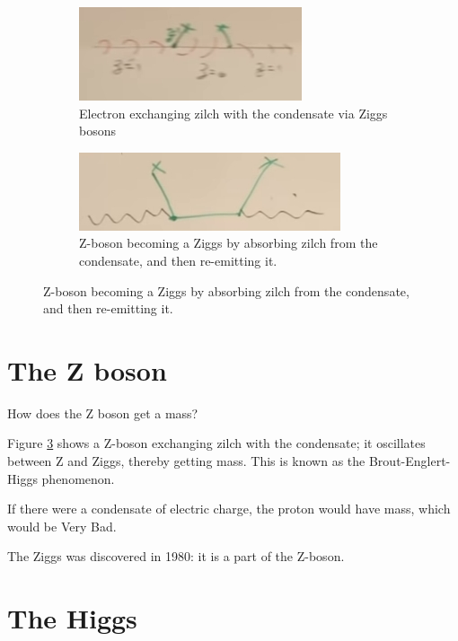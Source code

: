 \documentclass[]{article}
\begin{document}
\begin{figure}[H]
	\caption{Spontaneous breaking of chiral symmetry}
	\begin{subfigure}[t]{0.4\textwidth}
		\caption{Electron exchanging zilch with the condensate via Ziggs bosons}\label{fig:2-a3-zilch}
		\includegraphics[width=\textwidth]{2-a3-zilch}
	\end{subfigure}
	\begin{subfigure}[t]{0.4\textwidth}
		\caption{Z-boson becoming a Ziggs by absorbing zilch from the condensate, and then re-emitting it.}\label{fig:2-a3-zilch-Z}
		\includegraphics[width=\textwidth]{2-a3-zilch-Z}
	\end{subfigure}
\end{figure}

\section{The Z boson}

How does the Z boson get a mass?

Figure \ref{fig:2-a3-zilch-Z} shows a Z-boson exchanging zilch with the condensate; it oscillates between Z and Ziggs, thereby getting mass. This is known as the Brout-Englert-Higgs phenomenon.

If there were a condensate of electric charge, the proton would have mass, which would be Very Bad.

The Ziggs was discovered in 1980: it is a part of the Z-boson.

\section{The Higgs}
\end{document}
